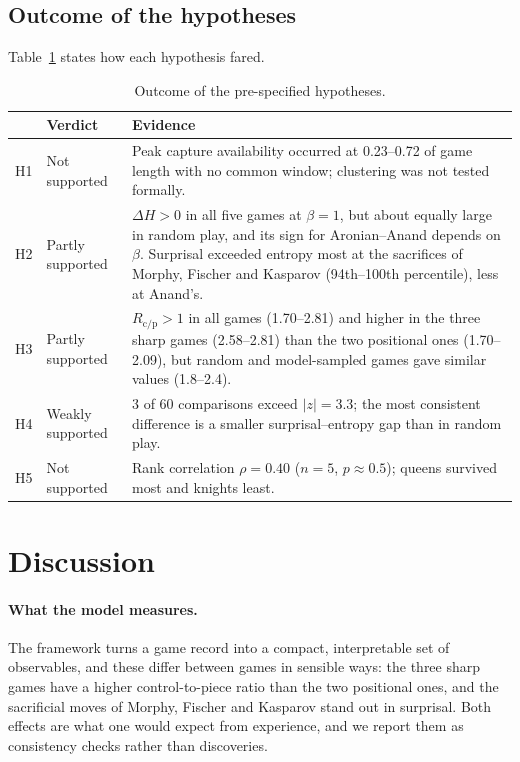 \documentclass[11pt,a4paper]{article}
\begin{document}
\begin{table}[t]
\centering
\caption{Sensitivity of the entropy observables to the inverse temperature $\beta$ (columns: $\beta=0.5$, 1, 2).}\label{tab:beta}
\resizebox{\textwidth}{!}{}
\end{table}

\subsection{Outcome of the hypotheses}
Table~\ref{tab:hyp} states how each hypothesis fared.

\begin{table}[t]
\centering
\caption{Outcome of the pre-specified hypotheses.}\label{tab:hyp}
\small
\begin{tabular}{p{}p{}p{}}
\toprule
 & Verdict & Evidence \\
\midrule
H1 & Not supported & Peak capture availability occurred at 0.23--0.72 of game length with no common window; clustering was not tested formally. \\
H2 & Partly supported & $\Delta H>0$ in all five games at $\beta=1$, but about equally large in random play, and its sign for Aronian--Anand depends on $\beta$. Surprisal exceeded entropy most at the sacrifices of Morphy, Fischer and Kasparov (94th--100th percentile), less at Anand's. \\
H3 & Partly supported & $R_{\mathrm{c/p}}>1$ in all games (1.70--2.81) and higher in the three sharp games (2.58--2.81) than the two positional ones (1.70--2.09), but random and model-sampled games gave similar values (1.8--2.4). \\
H4 & Weakly supported & 3 of 60 comparisons exceed $|z|=3.3$; the most consistent difference is a smaller surprisal--entropy gap than in random play. \\
H5 & Not supported & Rank correlation $\rho=0.40$ ($n=5$, $p\approx0.5$); queens survived most and knights least. \\
\bottomrule
\end{tabular}
\end{table}

\section{Discussion}\label{sec:discussion}

\paragraph{What the model measures.} The framework turns a game record into a compact, interpretable set of observables, and these differ between games in sensible ways: the three sharp games have a higher control-to-piece ratio than the two positional ones, and the sacrificial moves of Morphy, Fischer and Kasparov stand out in surprisal. Both effects are what one would expect from experience, and we report them as consistency checks rather than discoveries.
\end{document}
